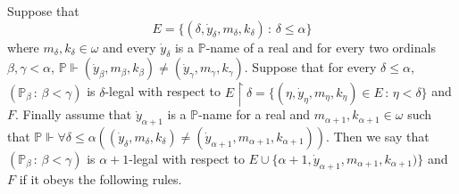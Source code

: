 \documentclass[10pt,a4paper]{amsart}
\newcommand{\forceP}{\mathbb{P}}
\begin{document}
Suppose that 
\[E= \{(\delta, \dot{y}_{\delta}, m_{\delta} ,k_{\delta}) \, : \,  \delta \le \alpha\}\]
where $m_{\delta},k_{\delta} \in \omega$ and every $\dot{y}_{\delta}$ is a  $\forceP$-name of a real and for every two ordinals $\beta, \gamma< \alpha$, $\forceP \Vdash (\dot{y}_{\beta}, m_{\beta},k_{\beta}) \ne (\dot{y}_{\gamma},m_{\gamma},k_{\gamma})$. Suppose that for every $\delta \le \alpha$, $(\forceP_{\beta} \, : \, \beta < \gamma )$ is $\delta$-legal with respect to $E \upharpoonright \delta = \{ (\eta, \dot{y}_{\eta},m_{\eta},k_{\eta}) \in E \, : \, \eta < \delta \}$ and $F$.
Finally assume that $\dot{y}_{\alpha+1}$ is a $\forceP$-name for a real and $m_{\alpha+1},k_{\alpha+1} \in \omega$ such that $\forceP \Vdash \forall \delta \le \alpha ((\dot{y}_{\delta},m_{\delta},k_{\delta}) \ne (\dot{y}_{\alpha+1},m_{\alpha+1},k_{\alpha+1}))$. Then we say that $(\forceP_{\beta} \, : \, \beta < \gamma )$ is $\alpha+1$-legal with respect to $E \cup \{\alpha+1, \dot{y}_{\alpha+1},m_{\alpha+1},k_{\alpha+1})\}$ and $F$ if it obeys the following rules. 
\end{document}
